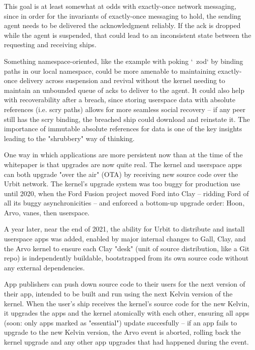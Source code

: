 \documentclass[twoside]{article}
\begin{document}
This goal is at least somewhat at odds with exactly-once network messaging, since in order for the invariants of exactly-once messaging to hold, the sending agent needs to be delivered the acknowledgment reliably.  If the ack is dropped while the agent is suspended, that could lead to an inconsistent state between the requesting and receiving ships.  

Something namespace-oriented, like the example with poking `~zod` by binding paths in our local namespace, could be more amenable to maintaining exactly-once delivery across suspension and revival without the kernel needing to maintain an unbounded queue of acks to deliver to the agent.  It could also help with recoverability after a breach, since storing userspace data with absolute references (i.e. scry paths) allows for more seamless social recovery – if any peer still has the scry binding, the breached ship could download and reinstate it.  The importance of immutable absolute references for data is one of the key insights leading to the "shrubbery" way of thinking.

One way in which applications are more persistent now than at the time of the whitepaper is that upgrades are now quite real.  The kernel and userspace apps can both upgrade "over the air" (OTA) by receiving new source code over the Urbit network.  The kernel's upgrade system was too buggy for production use until 2020, when the Ford Fusion project moved Ford into Clay – ridding Ford of all its buggy asynchronicities – and enforced a bottom-up upgrade order: Hoon, Arvo, vanes, then userspace.

A year later, near the end of 2021, the ability for Urbit to distribute and install userspace apps was added, enabled by major internal changes to Gall, Clay, and the Arvo kernel to ensure each Clay "desk" (unit of source distribution, like a Git repo) is independently buildable, bootstrapped from its own source code without any external dependencies.

App publishers can push down source code to their users for the next version of their app, intended to be built and run using the next Kelvin version of the kernel.  When the user's ship receives the kernel's source code for the new Kelvin, it upgrades the apps and the kernel atomically with each other, ensuring all apps (soon: only apps marked as "essential") update succesfully – if an app fails to upgrade to the new Kelvin version, the Arvo event is aborted, rolling back the kernel upgrade and any other app upgrades that had happened during the event.
\end{document}
